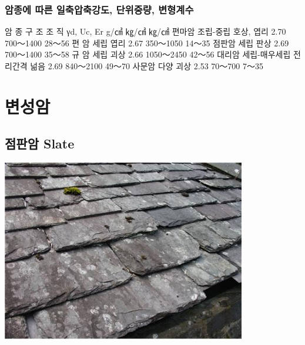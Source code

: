 \documentclass[12pt, a4paper, twoside]{book}
\begin{document}
		\subsection{암종에 따른 일축압축강도, 단위중량, 변형계수}

암 종		구 조			조 직			γd, 			Uc,			Er
											g/㎤			㎏/㎠		㎏/㎠
편마암		조립-중립			호상, 엽리		2.70			700～1400		28～56
편  암		세립				엽리				2.67			350～1050		14～35
점판암		세립				판상				2.69			700～1400		35～58
규  암		세립				괴상				2.66			1050～2450	42～56
대리암		세립-매우세립		전리간격 넒음		2.69			840～2100		49～70
사문암		다양				괴상				2.53			70～700		7～35












	


	\clearpage
	\chapter{변성암}
	\minitoc				%


	\clearpage
	\section{점판암 Slate}

				\begin{center}
				\includegraphics[width=0.8\textwidth]{./fig/slate_0001.jpg}
				\end{center}
\end{document}
